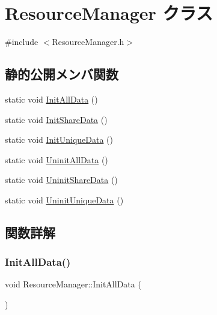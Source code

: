 \hypertarget{class_resource_manager}{}\section{Resource\+Manager クラス}
\label{class_resource_manager}


{\ttfamily \#include $<$Resource\+Manager.\+h$>$}

\subsection*{静的公開メンバ関数}
\begin{DoxyCompactItemize}
\item 
static void \mbox{\hyperlink{class_resource_manager_aa91dc794c10825768c5d85e69342632b}{Init\+All\+Data}} ()
\item 
static void \mbox{\hyperlink{class_resource_manager_af9be166f96250b01b9070a262cdb5d34}{Init\+Share\+Data}} ()
\item 
static void \mbox{\hyperlink{class_resource_manager_ab1ea00fb7eb4006bb9cbb48612da2c79}{Init\+Unique\+Data}} ()
\item 
static void \mbox{\hyperlink{class_resource_manager_a8d96f0a74a92212e8b2948467bb3cac7}{Uninit\+All\+Data}} ()
\item 
static void \mbox{\hyperlink{class_resource_manager_a786915d9c4df5a023a43db8c5332cb93}{Uninit\+Share\+Data}} ()
\item 
static void \mbox{\hyperlink{class_resource_manager_abcb135906cb991a49ec6e8c8db057de1}{Uninit\+Unique\+Data}} ()
\end{DoxyCompactItemize}


\subsection{関数詳解}
\mbox{\label{class_resource_manager_aa91dc794c10825768c5d85e69342632b}} 
\subsubsection{\texorpdfstring{Init\+All\+Data()}{InitAllData()}}
{\footnotesize\ttfamily void Resource\+Manager\+::\+Init\+All\+Data (\begin{DoxyParamCaption}{ }\end{DoxyParamCaption})\hspace{0.3cm}{\ttfamily [static]}}

